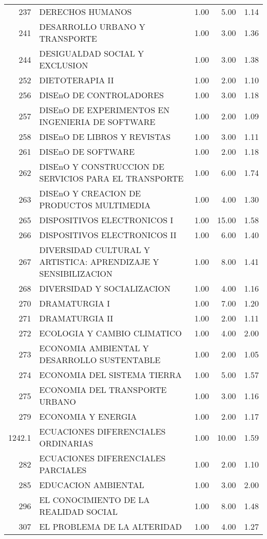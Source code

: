 \begin{table}[ht]
\begin{tabular}{rlrrr}
  237 & DERECHOS HUMANOS & 1.00 & 5.00 & 1.14 \\ 
  241 & DESARROLLO URBANO Y TRANSPORTE & 1.00 & 3.00 & 1.36 \\ 
  244 & DESIGUALDAD SOCIAL Y EXCLUSION & 1.00 & 3.00 & 1.38 \\ 
  252 & DIETOTERAPIA II & 1.00 & 2.00 & 1.10 \\ 
  256 & DISEnO DE CONTROLADORES & 1.00 & 3.00 & 1.18 \\ 
  257 & DISEnO DE EXPERIMENTOS EN INGENIERIA DE SOFTWARE & 1.00 & 2.00 & 1.09 \\ 
  258 & DISEnO DE LIBROS Y REVISTAS & 1.00 & 3.00 & 1.11 \\ 
  261 & DISEnO DE SOFTWARE & 1.00 & 2.00 & 1.18 \\ 
  262 & DISEnO Y CONSTRUCCION DE SERVICIOS PARA EL TRANSPORTE & 1.00 & 6.00 & 1.74 \\ 
  263 & DISEnO Y CREACION DE PRODUCTOS MULTIMEDIA & 1.00 & 4.00 & 1.30 \\ 
  265 & DISPOSITIVOS ELECTRONICOS I & 1.00 & 15.00 & 1.58 \\ 
  266 & DISPOSITIVOS ELECTRONICOS II & 1.00 & 6.00 & 1.40 \\ 
  267 & DIVERSIDAD CULTURAL Y ARTISTICA: APRENDIZAJE Y SENSIBILIZACION & 1.00 & 8.00 & 1.41 \\ 
  268 & DIVERSIDAD Y SOCIALIZACION & 1.00 & 4.00 & 1.16 \\ 
  270 & DRAMATURGIA I & 1.00 & 7.00 & 1.20 \\ 
  271 & DRAMATURGIA II & 1.00 & 2.00 & 1.11 \\ 
  272 & ECOLOGIA Y CAMBIO CLIMATICO & 1.00 & 4.00 & 2.00 \\ 
  273 & ECONOMIA AMBIENTAL Y DESARROLLO SUSTENTABLE & 1.00 & 2.00 & 1.05 \\ 
  274 & ECONOMIA DEL SISTEMA TIERRA & 1.00 & 5.00 & 1.57 \\ 
  275 & ECONOMIA DEL TRANSPORTE URBANO & 1.00 & 3.00 & 1.16 \\ 
  279 & ECONOMIA Y ENERGIA & 1.00 & 2.00 & 1.17 \\ 
  1242.1 & ECUACIONES DIFERENCIALES ORDINARIAS & 1.00 & 10.00 & 1.59 \\ 
  282 & ECUACIONES DIFERENCIALES PARCIALES & 1.00 & 2.00 & 1.10 \\ 
  285 & EDUCACION AMBIENTAL & 1.00 & 3.00 & 2.00 \\ 
  296 & EL CONOCIMIENTO DE LA REALIDAD SOCIAL & 1.00 & 8.00 & 1.48 \\ 
  307 & EL PROBLEMA DE LA ALTERIDAD & 1.00 & 4.00 & 1.27 \\ 

\end{tabular}
\end{table}
